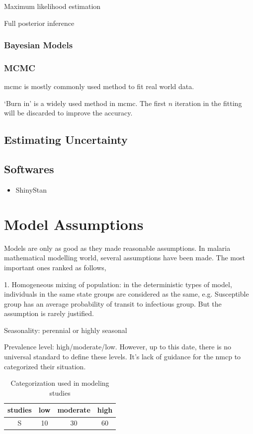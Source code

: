 \documentclass[a4paper, 12pt, twoside]{article}
\begin{document}
Maximum likelihood estimation

Full posterior inference

\subsubsection{Bayesian Models}

\subsubsection{MCMC}

\gls{mcmc} is mostly commonly used method to fit real world data.

`Burn in' is a widely used method in \gls{mcmc}. The first $n$ iteration in the fitting will be discarded to improve the accuracy.

\subsection{Estimating Uncertainty}

\subsection{Softwares}

\begin{itemize}
  \item ShinyStan
\end{itemize}

\section{Model Assumptions}
Models are only as good as they made reasonable assumptions. In malaria mathematical modelling world, several assumptions have been made. The most important ones ranked as follows,

1. Homogeneous mixing of population: in the deterministic types of model, individuals in the same state groups are considered as the same, e.g. Susceptible group has an average probability of transit to infectious group. But the assumption is rarely justified.

Seasonality: perennial or highly seasonal 

Prevalence level: high/moderate/low. 
However, up to this date, there is no universal standard to define these levels.
It's lack of guidance for the \gls{nmcp} to categorized their situation.

\begin{table}
  \centering
  \begin{tabular}{c S S S}
    \toprule
    studies & {low} & {moderate} & {high} \\
    \midrule
    S & 10 & 30 & 60 \\
    \bottomrule
  \end{tabular}
  \caption{Categorization used in modeling studies}
\end{table}
\end{document}
